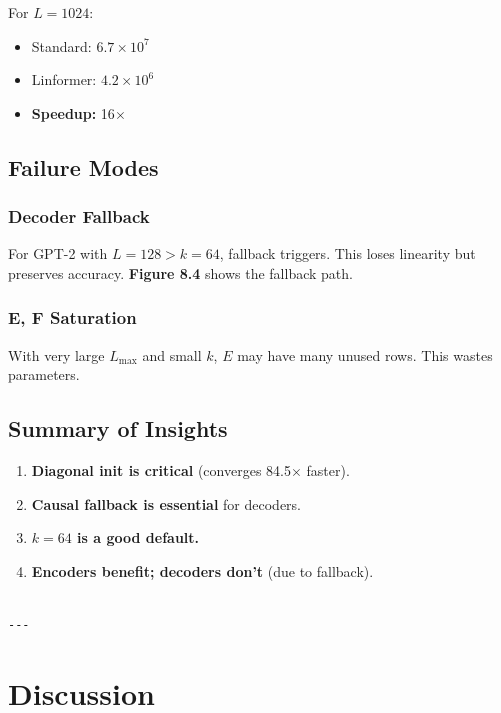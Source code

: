 For $L = 1024$:
\begin{itemize}
\item Standard: $6.7 \times 10^7$
\item Linformer: $4.2 \times 10^6$
\item \textbf{Speedup:} 16$\times$

\end{itemize}
\subsection{Failure Modes}

\subsubsection{Decoder Fallback}

For GPT-2 with $L = 128 > k = 64$, fallback triggers. This loses linearity 
but preserves accuracy. \textbf{Figure 8.4} shows the fallback path.

\subsubsection{E, F Saturation}

With very large $L_\text{max}$ and small $k$, $E$ may have many unused rows. 
This wastes parameters.

\subsection{Summary of Insights}

\begin{enumerate}
\item \textbf{Diagonal init is critical} (converges 84.5$\times$ faster).
\item \textbf{Causal fallback is essential} for decoders.
\item \textbf{$k = 64$ is a good default.}
\item \textbf{Encoders benefit; decoders don't} (due to fallback).
\end{enumerate}
\begin{lstlisting}

---
\end{lstlisting}

\section{Discussion}

